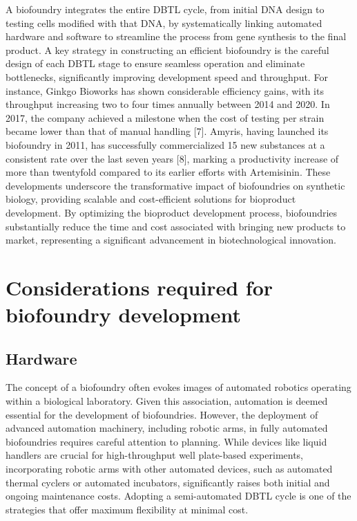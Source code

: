\documentclass[
  letterpaper,
]{book}
\begin{document}
A biofoundry integrates the entire DBTL cycle, from initial DNA design
to testing cells modified with that DNA, by systematically linking
automated hardware and software to streamline the process from gene
synthesis to the final product. A key strategy in constructing an
efficient biofoundry is the careful design of each DBTL stage to ensure
seamless operation and eliminate bottlenecks, significantly improving
development speed and throughput. For instance, Ginkgo Bioworks has
shown considerable efficiency gains, with its throughput increasing two
to four times annually between 2014 and 2020. In 2017, the company
achieved a milestone when the cost of testing per strain became lower
than that of manual handling {[}7{]}. Amyris, having launched its
biofoundry in 2011, has successfully commercialized 15 new substances at
a consistent rate over the last seven years {[}8{]}, marking a
productivity increase of more than twentyfold compared to its earlier
efforts with Artemisinin. These developments underscore the
transformative impact of biofoundries on synthetic biology, providing
scalable and cost-efficient solutions for bioproduct development. By
optimizing the bioproduct development process, biofoundries
substantially reduce the time and cost associated with bringing new
products to market, representing a significant advancement in
biotechnological innovation.

\section{Considerations required for biofoundry
development}\label{considerations-required-for-biofoundry-development}

\subsection{Hardware}\label{hardware}

The concept of a biofoundry often evokes images of automated robotics
operating within a biological laboratory. Given this association,
automation is deemed essential for the development of biofoundries.
However, the deployment of advanced automation machinery, including
robotic arms, in fully automated biofoundries requires careful attention
to planning. While devices like liquid handlers are crucial for
high-throughput well plate-based experiments, incorporating robotic arms
with other automated devices, such as automated thermal cyclers or
automated incubators, significantly raises both initial and ongoing
maintenance costs. Adopting a semi-automated DBTL cycle is one of the
strategies that offer maximum flexibility at minimal cost.
\end{document}
